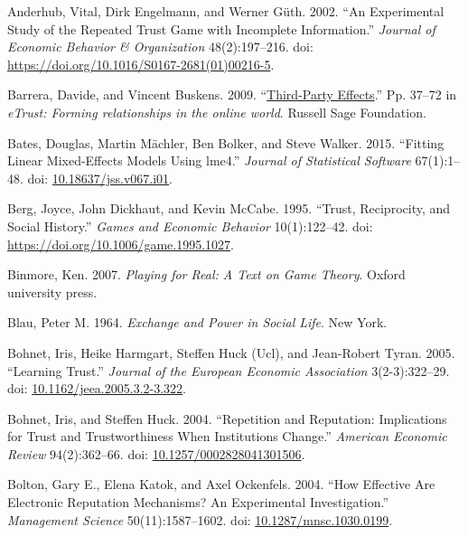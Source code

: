 \documentclass[
  11pt,
]{article}
\newlength{\cslhangindent}
\newlength{\cslentryspacingunit} %
\newenvironment{CSLReferences}[2] %
 {%
  \setlength{\parindent}{0pt}
  \ifodd #1
  \let\oldpar\par
  \def\par{\hangindent=\cslhangindent\oldpar}
  \fi
  \setlength{\parskip}{#2\cslentryspacingunit}
 }%
 {}
\begin{document}
\hypertarget{refs}{}
\begin{CSLReferences}{1}{0}
\leavevmode{}%
Anderhub, Vital, Dirk Engelmann, and Werner Güth. 2002. {``An Experimental Study of the Repeated Trust Game with Incomplete Information.''} \emph{Journal of Economic Behavior \& Organization} 48(2):197--216. doi: \url{https://doi.org/10.1016/S0167-2681(01)00216-5}.

\leavevmode{}%
Barrera, Davide, and Vincent Buskens. 2009. {``\href{http://www.jstor.org/stable/10.7758/9781610446082.6}{Third-Party Effects}.''} Pp. 37--72 in \emph{eTrust: Forming relationships in the online world}. Russell Sage Foundation.

\leavevmode{}%
Bates, Douglas, Martin Mächler, Ben Bolker, and Steve Walker. 2015. {``Fitting Linear Mixed-Effects Models Using {lme4}.''} \emph{Journal of Statistical Software} 67(1):1--48. doi: \href{https://doi.org/10.18637/jss.v067.i01}{10.18637/jss.v067.i01}.

\leavevmode{}%
Berg, Joyce, John Dickhaut, and Kevin McCabe. 1995. {``Trust, Reciprocity, and Social History.''} \emph{Games and Economic Behavior} 10(1):122--42. doi: \url{https://doi.org/10.1006/game.1995.1027}.

\leavevmode{}%
Binmore, Ken. 2007. \emph{Playing for Real: A Text on Game Theory}. Oxford university press.

\leavevmode{}%
Blau, Peter M. 1964. \emph{Exchange and Power in Social Life}. New York.

\leavevmode{}%
Bohnet, Iris, Heike Harmgart, Steffen Huck (Ucl), and Jean-Robert Tyran. 2005. {``{Learning Trust}.''} \emph{Journal of the European Economic Association} 3(2-3):322--29. doi: \href{https://doi.org/10.1162/jeea.2005.3.2-3.322}{10.1162/jeea.2005.3.2-3.322}.

\leavevmode{}%
Bohnet, Iris, and Steffen Huck. 2004. {``Repetition and Reputation: Implications for Trust and Trustworthiness When Institutions Change.''} \emph{American Economic Review} 94(2):362--66. doi: \href{https://doi.org/10.1257/0002828041301506}{10.1257/0002828041301506}.

\leavevmode{}%
Bolton, Gary E., Elena Katok, and Axel Ockenfels. 2004. {``How Effective Are Electronic Reputation Mechanisms? An Experimental Investigation.''} \emph{Management Science} 50(11):1587--1602. doi: \href{https://doi.org/10.1287/mnsc.1030.0199}{10.1287/mnsc.1030.0199}.


\end{CSLReferences}
\end{document}
